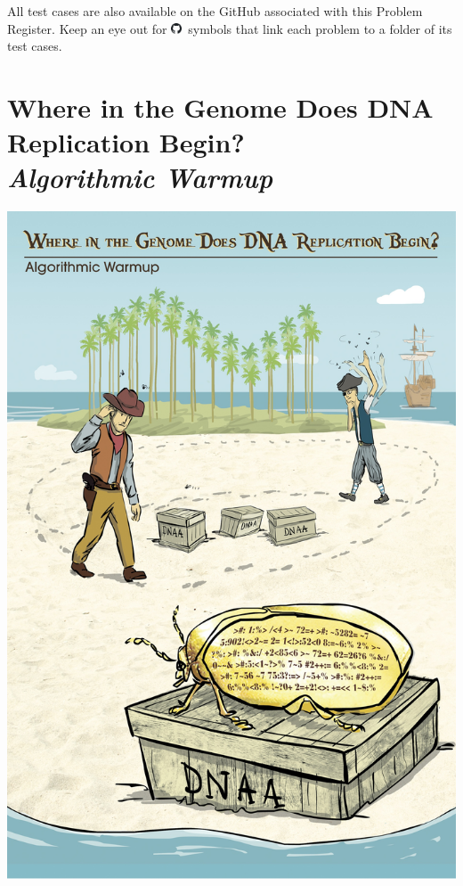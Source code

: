 \documentclass{article}
\newcommand{\gitlogo}{\includegraphics[height=12.5]{c0/gitlogo.png}}
\begin{document}
\noindent All test cases are also available on the GitHub associated with this Problem Register. Keep an eye out for \gitlogo \, symbols that link each problem to a folder of its test cases.
\pagebreak

\tableofcontents
\newpage

\section{Where in the Genome Does DNA Replication Begin?\\ \normalfont\emph{Algorithmic Warmup}}
\begin{center}
    \includegraphics[scale=0.72]{c1/c1.jpg}
\end{center}
\pagebreak
\end{document}
